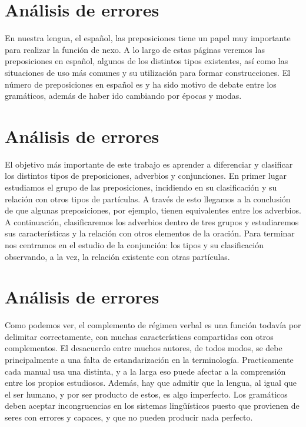 \documentclass[12pt, a4paper, oneside]{report}
\begin{document}
    \section{Análisis de errores}

En nuestra lengua, el español, %
las preposiciones tiene %
un papel muy importante para realizar la función de nexo.
A lo largo de estas páginas veremos %
las preposiciones en español, %
algunos de los distintos tipos existentes, así como las
situaciones de uso más comunes y su
utilización para formar construcciones. %
El
número de preposiciones en español es y
ha sido motivo de debate entre los
gramáticos,
además
de
haber
ido cambiando por épocas y modas.

\section{Análisis de errores}
El objetivo más importante de este trabajo es
aprender a diferenciar y clasiﬁcar los distintos tipos
de preposiciones, adverbios y conjunciones.
En primer lugar %
estudiamos el grupo de las preposiciones, incidiendo en su clasiﬁcación y su
relación con otros tipos de partículas. A través de
esto llegamos a la conclusión de que algunas
preposiciones, por ejemplo, tienen equivalentes
entre los adverbios.
A continuación, clasiﬁcaremos los adverbios
dentro de tres grupos y estudiaremos sus
características y la relación con otros elementos de
la oración.
Para terminar nos centramos en el estudio de la
conjunción: los tipos y su clasiﬁcación observando,
a la vez, la relación existente con otras partículas.


\section{Análisis de errores}
Como podemos ver, %
el complemento de régimen verbal es una función todavía por %
delimitar correctamente, con muchas características
compartidas con otros complementos. El desacuerdo entre muchos
autores, de todos modos, %
se debe principalmente a una falta de estandarización
en la terminología. Practicamente %
cada manual usa una distinta, y a la larga eso puede
afectar a la comprensión entre los propios
estudiosos. Además, hay que admitir que la
lengua, al igual que el ser humano, y por ser
producto de estos, es algo imperfecto. Los
gramáticos deben aceptar incongruencias en
los sistemas lingüísticos puesto que provienen de seres con errores y capaces,
y que no pueden producir nada perfecto.
\end{document}
